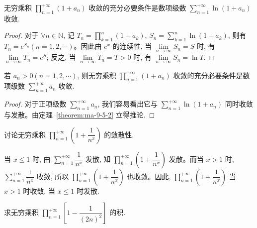 \begin{theorem}\label{theorem:ma-9-5-2}
无穷乘积 $\prod\limits_{n=1}^{+\infty}(1+a_n)$ 收敛的充分必要条件是数项级数 $\sum\limits_{n=1}^{+\infty}\ln(1+a_n)$ 收敛.
\end{theorem}


\begin{proof}
对于 $\forall n\in\mathbb{N}$, 记 $T_n=\prod\limits_{k=1}^n(1+a_k)$, $S_n=\sum\limits_{k=1}^n\ln(1+a_k)$, 则有 $T_n=e^{S_n}(n=1,2,\cdots)$。因此由 $e^x$ 的连续性, 当 $\lim\limits_{n\to\infty}S_n=S$ 时, 有 $\lim\limits_{n\to\infty}T_n=e^S$; 反之, 当 $\lim\limits_{n\to\infty}T_n=T>0$ 时, 有 $\lim\limits_{n\to\infty}S_n=\ln T$.
\end{proof}


\begin{corollary}\label{corollary:ma-9-source-87}
若 $a_n>0(n=1,2,\cdots)$, 则无穷乘积 $\prod\limits_{n=1}^{+\infty}(1+a_n)$ 收敛的充分必要条件是数项级数 $\sum\limits_{n=1}^{+\infty}a_n$ 收敛.
\end{corollary}


\begin{proof}
对于正项级数 $\sum\limits_{n=1}^{+\infty}a_n$, 我们容易看出它与 $\sum\limits_{n=1}^{+\infty}\ln(1+a_n)$ 同时收敛与发散。由定理~\ref{theorem:ma-9-5-2} 立得推论.
\end{proof}


\begin{example}\label{example:ma-9-5-1}
讨论无穷乘积 $\prod\limits_{n=1}^{+\infty}\left(1+\dfrac1{n^x}\right)$ 的敛散性.
\end{example}


\begin{solve}
当 $x\leq1$ 时, 由 $\sum\limits_{n=1}^{+\infty}\dfrac1{n^x}$ 发散, 知 $\prod\limits_{n=1}^{+\infty}\left(1+\dfrac1{n^x}\right)$ 发散。而当 $x>1$ 时, $\sum\limits_{n=1}^{+\infty}\dfrac1{n^x}$ 收敛, 所以 $\prod\limits_{n=1}^{+\infty}\left(1+\dfrac1{n^x}\right)$ 也收敛。因此, $\prod\limits_{n=1}^{+\infty}\left(1+\dfrac1{n^x}\right)$ 当 $x>1$ 时收敛, 当 $x\leq1$ 时发散.
\end{solve}


\begin{example}\label{example:ma-9-5-2}
求无穷乘积 $\prod\limits_{n=1}^{+\infty}\left[1-\dfrac1{(2n)^2}\right]$ 的积.
\end{example}


